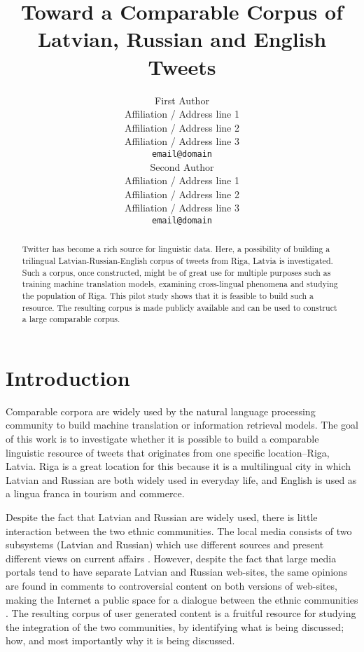 \documentclass[11pt,a4paper]{article}
\title{Toward a Comparable Corpus of Latvian, Russian and English Tweets}
\author{First Author \\
  Affiliation / Address line 1 \\
  Affiliation / Address line 2 \\
  Affiliation / Address line 3 \\
  {\tt email@domain} \\\And
  Second Author \\
  Affiliation / Address line 1 \\
  Affiliation / Address line 2 \\
  Affiliation / Address line 3 \\
  {\tt email@domain} \\}
\date{}
\begin{document}
\maketitle

\begin{abstract}
Twitter has become a rich source for linguistic data. Here, a possibility of building a trilingual Latvian-Russian-English corpus of tweets from Riga, Latvia is investigated. Such a corpus, once constructed, might be of great use for multiple purposes such as training machine translation models, examining cross-lingual phenomena and studying the population of Riga. This pilot study shows that it is feasible to build such a resource. The resulting corpus is made publicly available and can be used to construct a large comparable corpus.
\end{abstract}

\section{Introduction}
\label{sec:introduction}

Comparable corpora are widely used by the natural language processing community to build machine translation or information retrieval models. The goal of this work is to investigate whether it is possible to build a comparable linguistic resource of tweets that originates from one specific location--Riga, Latvia. Riga is a great location for this because it is a multilingual city in which Latvian and Russian are both widely used in everyday life, and English is used as a lingua franca in tourism and commerce.

Despite the fact that Latvian and Russian are widely used, there is little interaction between the two ethnic communities. The local media consists of two subsystems (Latvian and Russian) which use different sources and present different views on current affairs \cite{muiznieks2010}. However, despite the fact that large media portals tend to have separate Latvian and Russian web-sites, the same opinions are found in comments to controversial content on both versions of web-sites, making the Internet a public space for a dialogue  between the ethnic communities \cite{sulmane2010}. The resulting corpus of user generated content is a fruitful resource for studying the integration of the two communities, by identifying what is being discussed; how, and most importantly why it is being discussed.

\end{document}
